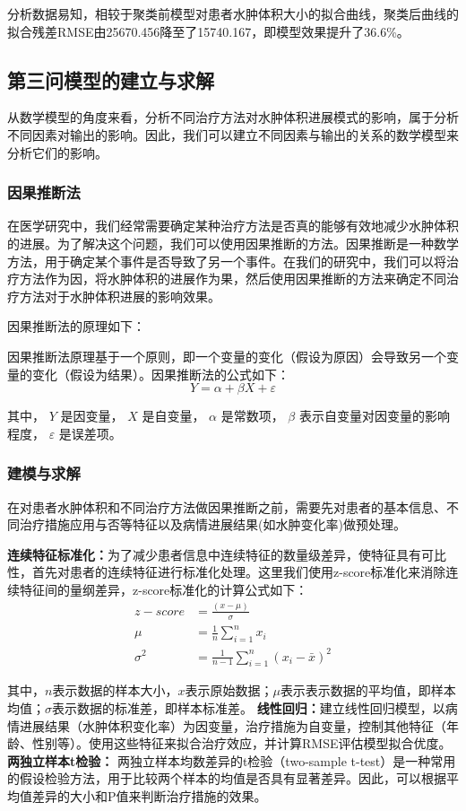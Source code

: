 \documentclass[bwprint]{gmcmthesis}
\begin{document}
分析数据易知，相较于聚类前模型对患者水肿体积大小的拟合曲线，聚类后曲线的拟合残差RMSE由25670.456降至了15740.167，即模型效果提升了36.6\%。

\subsection{第三问模型的建立与求解}
从数学模型的角度来看，分析不同治疗方法对水肿体积进展模式的影响，属于分析不同因素对输出的影响。因此，我们可以建立不同因素与输出的关系的数学模型来分析它们的影响。
\subsubsection{因果推断法}
在医学研究中，我们经常需要确定某种治疗方法是否真的能够有效地减少水肿体积的进展\cite{苗旺2018因果推断的统计方法}。为了解决这个问题，我们可以使用因果推断的方法。因果推断是一种数学方法，用于确定某个事件是否导致了另一个事件。在我们的研究中，我们可以将治疗方法作为因，将水肿体积的进展作为果，然后使用因果推断的方法来确定不同治疗方法对于水肿体积进展的影响效果。

因果推断法的原理如下：\par
因果推断法原理基于一个原则，即一个变量的变化（假设为原因）会导致另一个变量的变化（假设为结果）。因果推断法的公式如下：
\begin{equation}
Y=\alpha+\beta X+\varepsilon
\end{equation}

其中， $Y$ 是因变量， $X$ 是自变量， $\alpha$ 是常数项， $\beta$ 表示自变量对因变量的影响程度， $\varepsilon$ 是误差项。 

\subsubsection{建模与求解}
在对患者水肿体积和不同治疗方法做因果推断之前，需要先对患者的基本信息、不同治疗措施应用与否等特征以及病情进展结果(如水肿变化率)做预处理。

{\bf 连续特征标准化：}为了减少患者信息中连续特征的数量级差异，使特征具有可比性，首先对患者的连续特征进行标准化处理。这里我们使用z-score标准化来消除连续特征间的量纲差异，z-score标准化的计算公式如下：
\begin{align}
z-score &= \frac{(x - \mu)}{\sigma} \\
\mu &= \frac{1}{n}\sum_{i=1}^{n}x_i \\
\sigma^2 &= \frac{1}{n-1}\sum_{i=1}^{n}(x_i - \bar{x})^2 
\end{align}

其中，$n$表示数据的样本大小，$x$表示原始数据；$\mu$表示表示数据的平均值，即样本均值；$\sigma$表示数据的标准差，即样本标准差。
{\bf 线性回归：}建立线性回归模型，以病情进展结果（水肿体积变化率）为因变量，治疗措施为自变量，控制其他特征（年龄、性别等）。使用这些特征来拟合治疗效应，并计算RMSE评估模型拟合优度。
{\bf 两独立样本t检验：}
两独立样本均数差异的t检验（two-sample t-test）是一种常用的假设检验方法，用于比较两个样本的均值是否具有显著差异。因此，可以根据平均值差异的大小和P值来判断治疗措施的效果。
\end{document}
